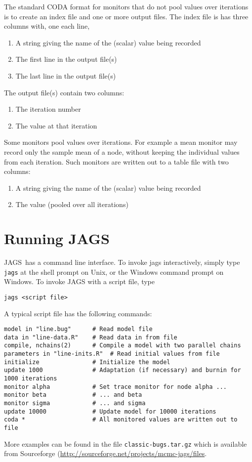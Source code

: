 \documentclass[11pt, a4paper, titlepage]{report}
\newcommand{\JAGS}{\textsf{JAGS}}
\begin{document}
The standard CODA format for monitors that do not pool values over
iterations is to create an index file and one or more output files.
The index file is has three columns with, one each line,
\begin{enumerate}
\item A string giving the name of the (scalar) value being recorded
\item The first line in the output file(s)
\item The last line in the output file(s)
\end{enumerate}
The output file(s) contain two columns:
\begin{enumerate}
\item The iteration number
\item The value at that iteration
\end{enumerate}

Some monitors pool values over iterations. For example a mean monitor
may record only the sample mean of a node, without keeping the
individual values from each iteration. Such monitors are written out
to a table file with two columns:
\begin{enumerate}
\item A string giving the name of the (scalar) value being recorded
\item The value (pooled over all iterations)
\end{enumerate}

\chapter{Running \JAGS}

\JAGS\ has a command line interface. To invoke jags interactively,
simply type \texttt{jags} at the shell prompt on Unix, or the Windows
command prompt on Windows. To invoke JAGS with a script file, type
\begin{verbatim}
jags <script file>
\end{verbatim}
A typical script file has the following commands: 
\begin{verbatim}
model in "line.bug"      # Read model file
data in "line-data.R"    # Read data in from file
compile, nchains(2)      # Compile a model with two parallel chains
parameters in "line-inits.R"  # Read initial values from file
initialize               # Initialize the model
update 1000              # Adaptation (if necessary) and burnin for 1000 iterations
monitor alpha            # Set trace monitor for node alpha ...
monitor beta             # ... and beta
monitor sigma            # ... and sigma
update 10000             # Update model for 10000 iterations
coda *                   # All monitored values are written out to file
\end{verbatim}
More examples can be found in the file \verb+classic-bugs.tar.gz+
which is available from Sourceforge
(\url{http://sourceforge.net/projects/mcmc-jags/files}.
\end{document}
